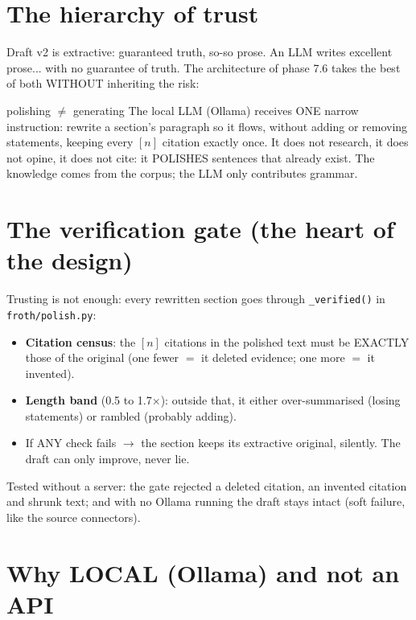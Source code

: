 \documentclass[11pt,a4paper]{article}
\begin{document}

\section{The hierarchy of trust}

Draft v2 is extractive: guaranteed truth, so-so prose. An LLM writes excellent prose... with no
guarantee of truth. The architecture of phase 7.6 takes the best of both WITHOUT inheriting the
risk:

\begin{concepto}{polishing $\neq$ generating}
The local LLM (Ollama) receives ONE narrow instruction: rewrite a section's paragraph so it
flows, without adding or removing statements, keeping every $[n]$ citation exactly once. It
does not research, it does not opine, it does not cite: it POLISHES sentences that already
exist. The knowledge comes from the corpus; the LLM only contributes grammar.
\end{concepto}

\section{The verification gate (the heart of the design)}

Trusting is not enough: every rewritten section goes through \texttt{\_verified()} in
\texttt{froth/polish.py}:

\begin{itemize}
  \item \textbf{Citation census}: the $[n]$ citations in the polished text must be EXACTLY
        those of the original (one fewer $=$ it deleted evidence; one more $=$ it invented).
  \item \textbf{Length band} (0.5 to 1.7$\times$): outside that, it either over-summarised
        (losing statements) or rambled (probably adding).
  \item If ANY check fails $\rightarrow$ the section keeps its extractive original, silently.
        The draft can only improve, never lie.
\end{itemize}

Tested without a server: the gate rejected a deleted citation, an invented citation and shrunk
text; and with no Ollama running the draft stays intact (soft failure, like the source
connectors).

\section{Why LOCAL (Ollama) and not an API}
\end{document}
